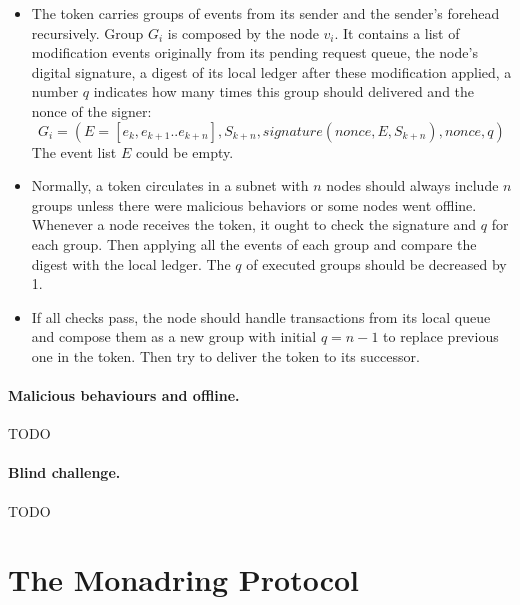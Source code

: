 \documentclass[11pt]{article}
\begin{document}
\begin{itemize}
\item The token carries groups of events from its sender and the sender{'}s forehead recursively.
Group $G_{i}$ is composed by the node $v_{i}$. It contains a list of modification events originally from its pending request queue, the node{'}s digital signature, a digest of its local ledger after these modification applied, a number $q$ indicates how many times this group should delivered and the nonce of the signer:
        \[G_{i} = (E = [e_{k}, e_{k+1}..e_{k+n}], S_{k+n}, signature(nonce, E, S_{k+n}), nonce, q)\]
The event list $E$ could be empty.

\item Normally, a token circulates in a subnet with $n$ nodes should always include $n$ groups unless there were malicious behaviors or some nodes went offline.
Whenever a node receives the token, it ought to check the signature and $q$ for each group.
Then applying all the events of each group and compare the digest with the local ledger.
The $q$ of executed groups should be decreased by 1.

\item If all checks pass, the node should handle transactions from its local queue and compose them as a new group with initial $q=n-1$ to replace previous one in the token.
Then try to deliver the token to its successor.
\end{itemize}

\paragraph{Malicious behaviours and offline.} TODO

\paragraph{Blind challenge.} TODO %

\section{The Monadring Protocol}


\end{document}
